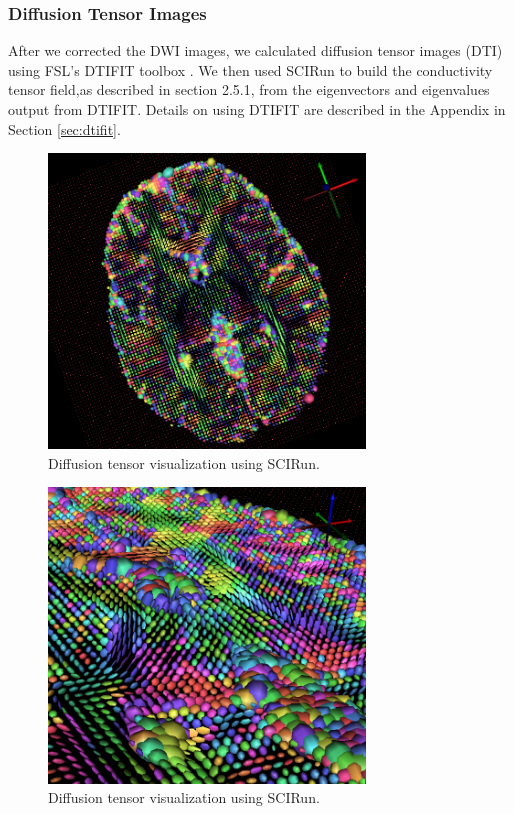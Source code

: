 \subsubsection{Diffusion Tensor Images}

After we corrected the DWI images, we calculated diffusion tensor images (DTI) using FSL's DTIFIT toolbox \cite{ref:dtifit}. We then used SCIRun \cite{ref:scirun} to build the conductivity tensor field,as described in section 2.5.1, from the eigenvectors and eigenvalues output from DTIFIT. Details on using DTIFIT are described in the Appendix in Section \ref{sec:dtifit}.

\begin{figure}[H]
\begin{center}
\includegraphics[width=0.75\textwidth]{Figures/DTI_1.png}
\caption{Diffusion tensor visualization using SCIRun.}
\label{fig:tensorvis}
\end{center}
\end{figure}

\begin{figure}[H]
\begin{center}
\includegraphics[width=0.75\textwidth]{Figures/DTI_2.png}
\caption{Diffusion tensor visualization using SCIRun.}
\label{fig:tensorvis2}
\end{center}
\end{figure}

